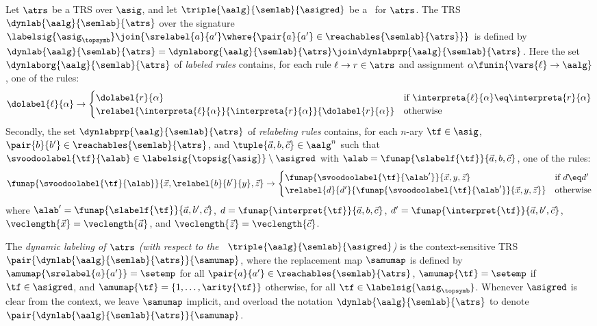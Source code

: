 \begin{definition}\label{def:dynlab}
  Let $\atrs$ be a TRS over $\asig$, 
  and let $\triple{\aalg}{\semlab}{\asigred}$ be a \clabeling\ for $\atrs$.
  The TRS $\dynlab{\aalg}{\semlab}{\atrs}$ over the signature 
  $\labelsig{\asig_{\topsymb}} \join \{ \srelabel{a}{a'} \where { \pair{a}{a'} \in \reachables{\semlab}{\atrs} } \}$
is defined by 
  $\dynlab{\aalg}{\semlab}{\atrs} = \dynlaborg{\aalg}{\semlab}{\atrs} \join \dynlabprp{\aalg}{\semlab}{\atrs}$. 
  Here the set $\dynlaborg{\aalg}{\semlab}{\atrs}$ of \emph{labeled rules} contains,   
  for each rule ${\ell\to r}\in\atrs$ and assignment $\alpha\funin{\vars{\ell}\to\aalg}$,
  one of the rules:
  \begin{align*}
    \dolabel{\ell}{\alpha} \to 
    \begin{cases}
      \dolabel{r}{\alpha}
      & \text{if $\interpreta{\ell}{\alpha} \eq \interpreta{r}{\alpha}$}
      \\
      \relabel{\interpreta{\ell}{\alpha}}{\interpreta{r}{\alpha}}{\dolabel{r}{\alpha}}
      & \text{otherwise}
    \end{cases}  
  \end{align*}
Secondly, the set $\dynlabprp{\aalg}{\semlab}{\atrs}$ of 
  \emph{relabeling rules} contains,
  for each $n$-ary $\tf\in\asig$, $\pair{b}{b'}\in\reachables{\semlab}{\atrs}$, 
  and $\tuple{\vec{a},b,\vec{c}} \in \aalg^n$ 
such that 
  $\svoodoolabel{\tf}{\alab} \in { \labelsig{\topsig{\asig}} \setminus \asigred }$ 
  with $\alab = \funap{\slabelf{\tf}}{\vec{a},b,\vec{c}}$,
  one of the rules:
  \begin{align*}
    \funap{\svoodoolabel{\tf}{\alab}}{\vec{x},\relabel{b}{b'}{y},\vec{z}}
    \to
    \begin{cases}
      \funap{\svoodoolabel{\tf}{\alab'}}{\vec{x},y,\vec{z}}
      &\text{if $d \eq d'$} \\
      \relabel{d}{d'}{\funap{\svoodoolabel{\tf}{\alab'}}{\vec{x},y,\vec{z}}}
      &\text{otherwise}
    \end{cases}
  \end{align*}
  where 
  $\alab' = \funap{\slabelf{\tf}}{\vec{a},b',\vec{c}}$,
  $d = \funap{\interpret{\tf}}{\vec{a},b,\vec{c}}$,
  $d' = \funap{\interpret{\tf}}{\vec{a},b',\vec{c}}$,
  $\veclength{\vec{x}} = \veclength{\vec{a}}$, 
  and $\veclength{\vec{z}} = \veclength{\vec{c}}$.

  The \emph{dynamic labeling of $\atrs$ (with respect to the \clabeling~$\triple{\aalg}{\semlab}{\asigred}$)}
  is the context-sensitive TRS~$\pair{\dynlab{\aalg}{\semlab}{\atrs}}{\samumap}$,
  where the replacement map $\samumap$ is defined by 
  $\amumap{\srelabel{a}{a'}} = \setemp$ for all $\pair{a}{a'}\in\reachables{\semlab}{\atrs}$,
  $\amumap{\tf} = \setemp$ if $\tf \in \asigred$,
  and $\amumap{\tf} = \{1,\ldots,\arity{\tf}\}$ otherwise,
  for all $\tf\in\labelsig{\asig_{\topsymb}}$.
Whenever $\asigred$ is clear from the context, we leave $\samumap$ implicit,
  and overload the notation $\dynlab{\aalg}{\semlab}{\atrs}$ to denote 
  $\pair{\dynlab{\aalg}{\semlab}{\atrs}}{\samumap}$.
\end{definition}


